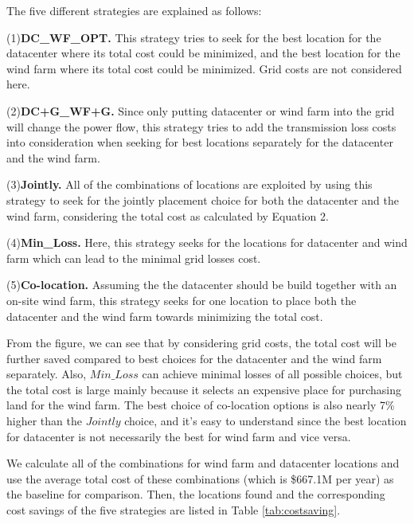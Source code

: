 The five different strategies are explained as follows:

(1)\textbf{DC\_WF\_OPT.} This strategy tries to seek for the best location for the datacenter where its total cost could be minimized, and the best location for the wind farm where its total cost could be minimized.  Grid costs are not considered here.

(2)\textbf{DC+G\_WF+G.} Since only putting datacenter or wind farm into the grid will change the power flow, this strategy tries to add the transmission loss costs into consideration when seeking for best locations separately for the datacenter and the wind farm.

(3)\textbf{Jointly.} All of the combinations of locations are exploited by using this strategy to seek for the jointly placement choice for both the datacenter and the wind farm, considering the total cost as calculated by Equation 2.

(4)\textbf{Min\_Loss.} Here, this strategy seeks for the locations for datacenter and wind farm which can lead to the minimal grid losses cost.

(5)\textbf{Co-location.} Assuming the the datacenter should be build together with an on-site wind farm, this strategy seeks for one location to place both the datacenter and the wind farm towards minimizing the total cost.

From the figure, we can see that by considering grid costs, the total cost will be further saved compared to best choices for the datacenter and the wind farm separately. Also, $Min\_Loss$ can achieve minimal losses of all possible choices, but the total cost is large mainly because it selects an expensive place for purchasing land for the wind farm. The best choice of co-location options is also nearly 7\% higher than the $Jointly$ choice, and it's easy to understand since the best location for datacenter is not necessarily the best for wind farm and vice versa.

We calculate all of the combinations for wind farm and datacenter locations and use the average total cost of these combinations (which is \$667.1M per year) as the baseline for comparison. Then, the locations found and the corresponding cost savings of the five strategies are listed in Table \ref{tab:costsaving}.

